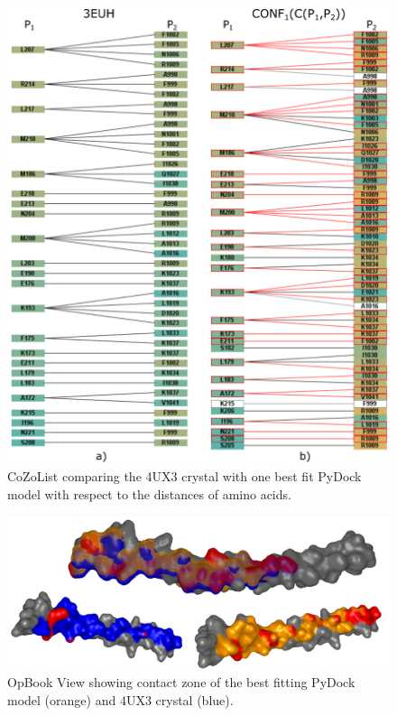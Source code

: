 \documentclass{bmcart}
\begin{document}
\begin{backmatter}
\begin{figure}[h!]
    \centering
  \includegraphics[width=\columnwidth]{images/figure13.pdf}
    \caption{ CoZoList comparing the 4UX3 crystal with one best fit PyDock model with respect to the distances of amino acids.}
  \label{fig:coiled2}
\end{figure}

\begin{figure}[!h]
  \centering
  \includegraphics[width=\columnwidth]{images/figure14.png}
  \caption{ OpBook View showing contact zone of  the best fitting PyDock model (orange) and 4UX3 crystal (blue).}
  \label{fig:selection_4_final_SMC3_PyDock}
\end{figure}


\end{backmatter}
\end{document}
